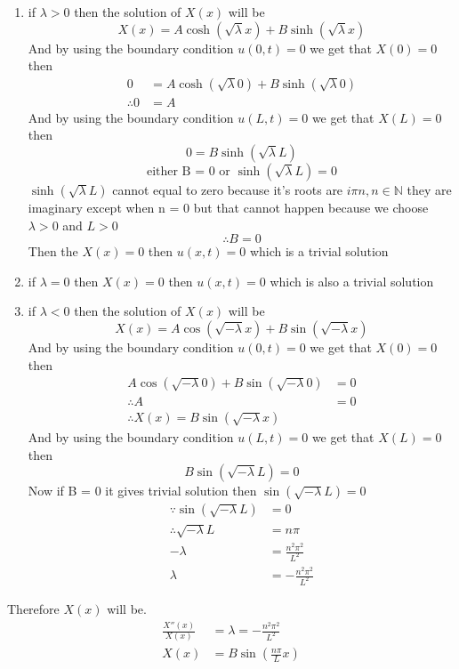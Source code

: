 \begin{enumerate}
\item if $\lambda > 0$ then the solution of $X(x)$ will be 
\[
X(x) = A \cosh(\sqrt{\lambda} x) + B \sinh(\sqrt{\lambda}x)
\]
And by using the boundary condition $u(0,t) = 0$ we get that $X(0) = 0$ then
\begin{align*}
    0 &= A \cosh(\sqrt{\lambda} 0) + B \sinh(\sqrt{\lambda}0)\\
    \therefore 0 &= A
\end{align*}
And by using the boundary condition $u(L,t) = 0$ we get that $X(L) = 0$ then
\[
    0 = B \sinh(\sqrt{\lambda}L)    
\]
\[
    \text{either B = 0 or } \sinh(\sqrt{\lambda}L) = 0    
\]    
$\sinh(\sqrt{\lambda}L)$ cannot equal to zero because it's roots are $i \pi n , n \in \mathbb{N}$ 
they are imaginary except when n = 0 but that cannot happen because we choose $\lambda > 0$ and $L > 0$
\[
    \therefore B = 0
\]
Then the $X(x) = 0$ then $u(x,t) = 0 $ which is a trivial solution
\item if $\lambda = 0$ then $X(x) = 0 $ then $u(x,t) = 0 $ which is also a trivial solution
\item if $\lambda < 0$ then the solution of $X(x)$ will be 
\[
X(x) = A \cos(\sqrt{-\lambda} x) + B \sin(\sqrt{-\lambda}x)
\]
And by using the boundary condition $u(0,t) = 0$ we get that $X(0) = 0$ then
\begin{align*}
    A \cos(\sqrt{-\lambda} 0) + B \sin(\sqrt{-\lambda}0) &= 0 
    \\
    \therefore A &= 0
    \\
    \therefore X(x) = B \sin(\sqrt{-\lambda}x)
\end{align*} 
And by using the boundary condition $u(L,t) = 0$ we get that $X(L) = 0$ then
\[
     B \sin  (\sqrt{-\lambda}L) = 0
\]
Now if B = 0 it gives trivial solution then $\sin(\sqrt{-\lambda}L) = 0$ 
\begin{align*}
    \because \sin(\sqrt{-\lambda}L) &= 0 \\
    \therefore \sqrt{-\lambda} L &= n \pi \\
    -\lambda &= \frac{n^2 \pi^2}{L^2}\\
    \lambda &= -\frac{n^2 \pi^2}{L^2}
\end{align*}
\end{enumerate}
Therefore $X(x)$ will be.
\begin{align*}
\frac{X''(x)}{X(x)} &= \lambda = -\frac{n^2 \pi^2}{L^2}
\\
X(x) &= B \sin\left(\frac{n\pi}{L}x\right)
\end{align*}
